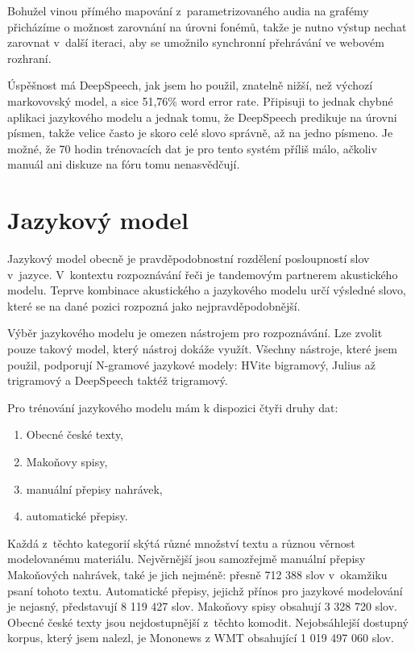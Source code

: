 Bohužel vinou přímého mapování z~parametrizovaného audia na grafémy přicházíme o
možnost zarovnání na úrovni fonémů, takže je nutno výstup nechat zarovnat
v~další iteraci, aby se umožnilo synchronní přehrávání ve webovém rozhraní.

Úspěšnost má DeepSpeech, jak jsem ho použil, znatelně nižší, než výchozí
markovovský model, a sice 51,76\% word error rate. Připisuji to jednak chybné aplikaci jazykového modelu a
jednak tomu, že DeepSpeech predikuje na úrovni písmen, takže velice často je
skoro celé slovo správně, až na jedno písmeno. Je možné, že 70 hodin trénovacích
dat je pro tento systém příliš málo, ačkoliv manuál ani diskuze na fóru tomu
nenasvědčují.

\section{Jazykový model}
\label{sec:jazykovy-model}

Jazykový model obecně je pravděpodobnostní rozdělení posloupností slov
v~jazyce.\cite{ponte1998language} V~kontextu rozpoznávání řeči je tandemovým
partnerem akustického modelu.\cite{jelinek1990self} Teprve kombinace akustického
a jazykového modelu určí výsledné slovo, které se na dané pozici rozpozná jako
nejpravděpodobnější.

Výběr jazykového modelu je omezen nástrojem pro rozpoznávání. Lze zvolit pouze
takový model, který nástroj dokáže využít. Všechny nástroje, které jsem použil,
podporují N-gramové jazykové modely: HVite bigramový, Julius až trigramový a
DeepSpeech taktéž trigramový.

Pro trénování jazykového modelu mám k dispozici čtyři druhy dat:
\begin{enumerate}
\item{Obecné české texty,}
\item{Makoňovy spisy,}
\item{manuální přepisy nahrávek,}
\item{automatické přepisy.}
\end{enumerate}

Každá z~těchto kategorií skýtá různé množství textu a různou věrnost
modelovanému materiálu. Nejvěrnější jsou samozřejmě manuální přepisy Makoňových
nahrávek, také je jich nejméně: přesně 712 388 slov v~okamžiku psaní tohoto
textu. Automatické přepisy, jejichž přínos pro jazykové modelování je nejasný,
představují 8 119 427 slov. Makoňovy spisy obsahují 3 328 720 slov. Obecné české
texty jsou nejdostupnější z~těchto komodit. Nejobsáhlejší dostupný korpus, který
jsem nalezl, je Mononews z WMT obsahující 1 019 497 060 slov.

